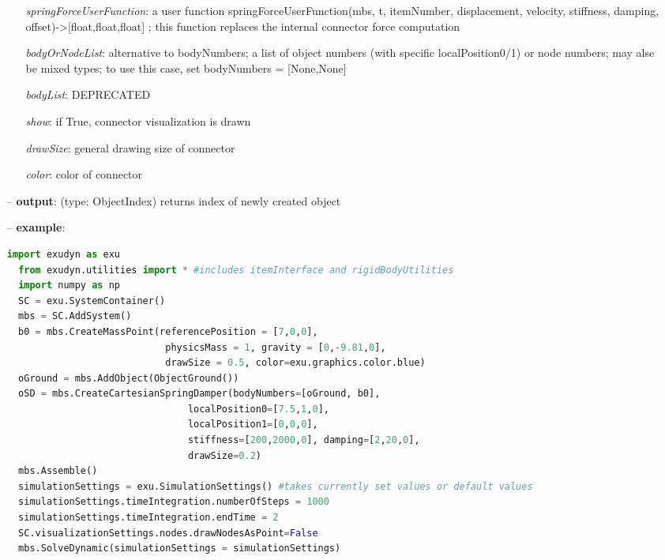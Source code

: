 \begin{itemize}[leftmargin=0.7cm]
\begin{itemize}[leftmargin=1.2cm]
\item[]{\it springForceUserFunction}: a user function springForceUserFunction(mbs, t, itemNumber, displacement, velocity, stiffness, damping, offset)->[float,float,float] ; this function replaces the internal connector force computation
\item[]{\it bodyOrNodeList}: alternative to bodyNumbers; a list of object numbers (with specific localPosition0/1) or node numbers; may alse be mixed types; to use this case, set bodyNumbers = [None,None]
\item[]{\it bodyList}: DEPRECATED
\item[]{\it show}: if True, connector visualization is drawn
\item[]{\it drawSize}: general drawing size of connector
\item[]{\it color}: color of connector
\end{itemize}
\item[--]
{\bf output}: (type: ObjectIndex) returns index of newly created object
\item[--]
{\bf example}: \vspace{-12pt}\ei\begin{lstlisting}[language=Python, xleftmargin=36pt]
  import exudyn as exu
  from exudyn.utilities import * #includes itemInterface and rigidBodyUtilities
  import numpy as np
  SC = exu.SystemContainer()
  mbs = SC.AddSystem()
  b0 = mbs.CreateMassPoint(referencePosition = [7,0,0],
                            physicsMass = 1, gravity = [0,-9.81,0],
                            drawSize = 0.5, color=exu.graphics.color.blue)
  oGround = mbs.AddObject(ObjectGround())
  oSD = mbs.CreateCartesianSpringDamper(bodyNumbers=[oGround, b0],
                                localPosition0=[7.5,1,0],
                                localPosition1=[0,0,0],
                                stiffness=[200,2000,0], damping=[2,20,0],
                                drawSize=0.2)
  mbs.Assemble()
  simulationSettings = exu.SimulationSettings() #takes currently set values or default values
  simulationSettings.timeIntegration.numberOfSteps = 1000
  simulationSettings.timeIntegration.endTime = 2
  SC.visualizationSettings.nodes.drawNodesAsPoint=False
  mbs.SolveDynamic(simulationSettings = simulationSettings)
\end{lstlisting}\vspace{-24pt}\bi\item[]\vspace{-24pt}\vspace{12pt}\end{itemize}
%

